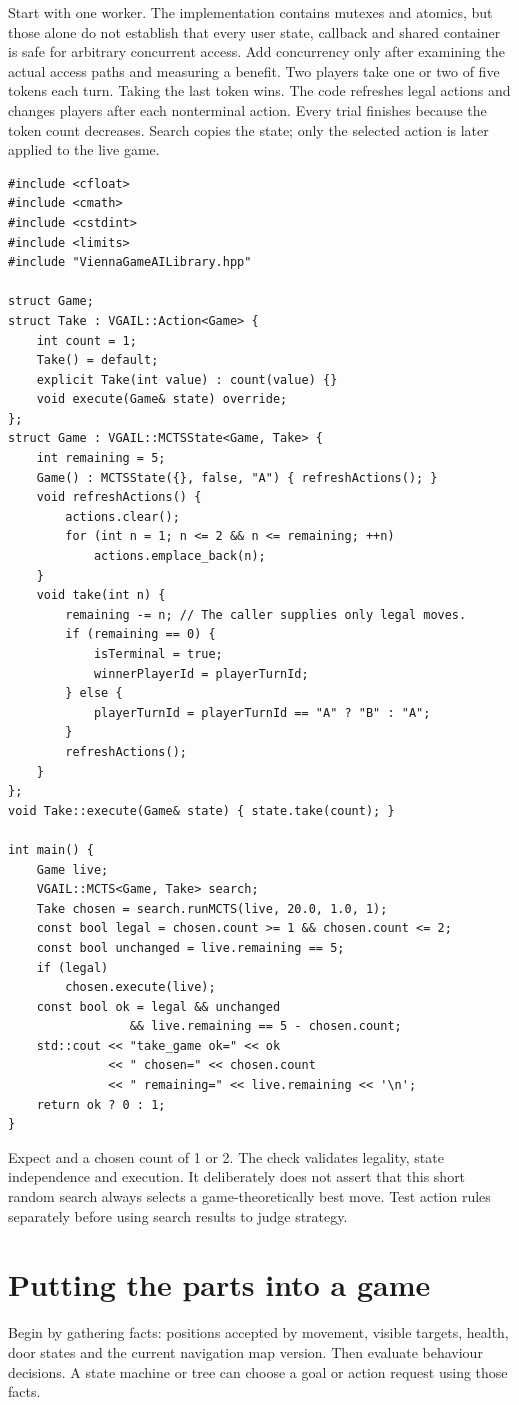 \documentclass[11pt,a4paper]{article}
\begin{document}
Start with one worker. The implementation contains mutexes and atomics, but those alone do not establish that every user state, callback and shared container is safe for arbitrary concurrent access. Add concurrency only after examining the actual access paths and measuring a benefit.
Two players take one or two of five tokens each turn. Taking the last token wins. The code refreshes legal actions and changes players after each nonterminal action. Every trial finishes because the token count decreases. Search copies the state; only the selected action is later applied to the live game.%
\begin{lstlisting}[basicstyle=\ttfamily\footnotesize]
#include <cfloat>
#include <cmath>
#include <cstdint>
#include <limits>
#include "ViennaGameAILibrary.hpp"

struct Game;
struct Take : VGAIL::Action<Game> {
    int count = 1;
    Take() = default;
    explicit Take(int value) : count(value) {}
    void execute(Game& state) override;
};
struct Game : VGAIL::MCTSState<Game, Take> {
    int remaining = 5;
    Game() : MCTSState({}, false, "A") { refreshActions(); }
    void refreshActions() {
        actions.clear();
        for (int n = 1; n <= 2 && n <= remaining; ++n)
            actions.emplace_back(n);
    }
    void take(int n) {
        remaining -= n; // The caller supplies only legal moves.
        if (remaining == 0) {
            isTerminal = true;
            winnerPlayerId = playerTurnId;
        } else {
            playerTurnId = playerTurnId == "A" ? "B" : "A";
        }
        refreshActions();
    }
};
void Take::execute(Game& state) { state.take(count); }

int main() {
    Game live;
    VGAIL::MCTS<Game, Take> search;
    Take chosen = search.runMCTS(live, 20.0, 1.0, 1);
    const bool legal = chosen.count >= 1 && chosen.count <= 2;
    const bool unchanged = live.remaining == 5;
    if (legal)
        chosen.execute(live);
    const bool ok = legal && unchanged
                 && live.remaining == 5 - chosen.count;
    std::cout << "take_game ok=" << ok
              << " chosen=" << chosen.count
              << " remaining=" << live.remaining << '\n';
    return ok ? 0 : 1;
}
\end{lstlisting}
Expect  and a chosen count of 1 or 2. The check validates legality, state independence and execution. It deliberately does not assert that this short random search always selects a game-theoretically best move. Test action rules separately before using search results to judge strategy.
\clearpage\part{Putting the parts into a game}
Begin by gathering facts: positions accepted by movement, visible targets, health, door states and the current navigation map version. Then evaluate behaviour decisions. A state machine or tree can choose a goal or action request using those facts.
\end{document}
